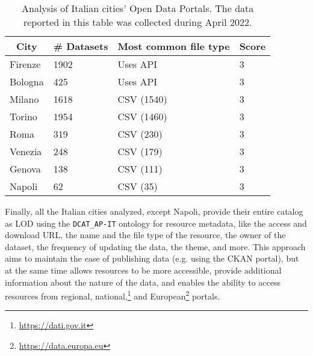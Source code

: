 \begin{table}[!ht]
  \onehalfspacing
  \centering
  \begin{tabular}{|l|l|l|l|}
    \hline
    \multicolumn{1}{|c|}{\textbf{City}} & \multicolumn{1}{c|}{\textbf{\# Datasets}} & \multicolumn{1}{c|}{\textbf{Most common file type}} & \multicolumn{1}{c|}{\textbf{Score}} \\ \hline
    Firenze                   & 1902                                             & Uses \acs{API}                                       & 3                                   \\ \hline
    Bologna                   & 425                                              & Uses \acs{API}                                       & 3                                   \\ \hline
    Milano                    & 1618                                             & CSV (1540)                                           & 3                                   \\ \hline
    Torino                    & 1954                                             & CSV (1460)                                           & 3                                   \\ \hline
    Roma                      & 319                                              & CSV (230)                                            & 3                                   \\ \hline
    Venezia                   & 248                                              & CSV (179)                                            & 3                                   \\ \hline
    Genova                    & 138                                              & CSV (111)                                            & 3                                   \\ \hline
    Napoli                    & 62                                               & CSV (35)                                             & 3                                   \\ \hline
  \end{tabular}
  \caption{Analysis of Italian cities' Open Data Portals. The data reported in this table was collected during April 2022.}
  \label{tab:italian-cities}
\end{table}

Finally, all the Italian cities analyzed, except Napoli, provide their entire catalog as \ac{LOD} using the \verb#DCAT_AP-IT# ontology for resource metadata, like the access and download \acs{URL}, the name and the file type of the resource, the owner of the dataset, the frequency of updating the data, the theme, and more. This approach aims to maintain the ease of publishing data (e.g. using the CKAN portal), but at the same time allows resources to be more accessible, provide additional information about the nature of the data, and enables the ability to access resources from regional, national,\footnote{\url{https://dati.gov.it}} and European\footnote{\url{https://data.europa.eu}} portals.
